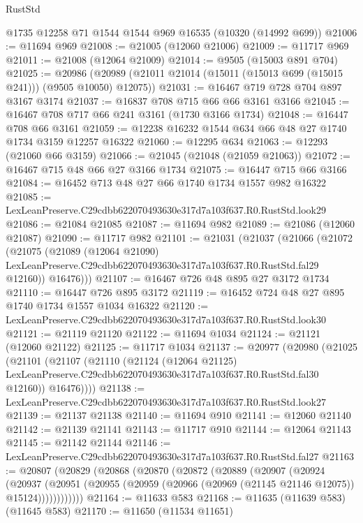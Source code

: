 \begin{lexlean}{RustStd}
\begin{coremodule}
    @1735
    @12258
    @71
    @1544
    @1544
    @969
    @16535
    (@10320 (@14992 @699))
@21006 := @11694 @969
@21008 := @21005 (@12060 @21006)
@21009 := @11717 @969
@21011 := @21008 (@12064 @21009)
@21014 := @9505 (@15003 @891 @704)
@21025 := @20986 (@20989 (@21011 @21014 (@15011 (@15013 @699 (@15015 @241))) (@9505 @10050) @12075))
@21031 := @16467 @719 @728 @704 @897 @3167 @3174
@21037 := @16837 @708 @715 @66 @66 @3161 @3166
@21045 := @16467 @708 @717 @66 @241 @3161 (@1730 @3166 @1734)
@21048 := @16447 @708 @66 @3161
@21059 := @12238 @16232 @1544 @634 @66 @48 @27 @1740 @1734 @3159 @12257 @16322
@21060 := @12295 @634
@21063 := @12293 (@21060 @66 @3159)
@21066 := @21045 (@21048 (@21059 @21063))
@21072 := @16467 @715 @48 @66 @27 @3166 @1734
@21075 := @16447 @715 @66 @3166
@21084 := @16452 @713 @48 @27 @66 @1740 @1734 @1557 @982 @16322
@21085 := LexLeanPreserve.C29cdbb622070493630e317d7a103f637.R0.RustStd.look29
@21086 := @21084 @21085
@21087 := @11694 @982
@21089 := @21086 (@12060 @21087)
@21090 := @11717 @982
@21101 := @21031
    (@21037
      (@21066
        (@21072
          (@21075
            (@21089
              (@12064 @21090)
              LexLeanPreserve.C29cdbb622070493630e317d7a103f637.R0.RustStd.fal29
              @12160))
          @16476)))
@21107 := @16467 @726 @48 @895 @27 @3172 @1734
@21110 := @16447 @726 @895 @3172
@21119 := @16452 @724 @48 @27 @895 @1740 @1734 @1557 @1034 @16322
@21120 := LexLeanPreserve.C29cdbb622070493630e317d7a103f637.R0.RustStd.look30
@21121 := @21119 @21120
@21122 := @11694 @1034
@21124 := @21121 (@12060 @21122)
@21125 := @11717 @1034
@21137 := @20977
    (@20980
      (@21025
        (@21101
          (@21107
            (@21110
              (@21124
                (@12064 @21125)
                LexLeanPreserve.C29cdbb622070493630e317d7a103f637.R0.RustStd.fal30
                @12160))
            @16476))))
@21138 := LexLeanPreserve.C29cdbb622070493630e317d7a103f637.R0.RustStd.look27
@21139 := @21137 @21138
@21140 := @11694 @910
@21141 := @12060 @21140
@21142 := @21139 @21141
@21143 := @11717 @910
@21144 := @12064 @21143
@21145 := @21142 @21144
@21146 := LexLeanPreserve.C29cdbb622070493630e317d7a103f637.R0.RustStd.fal27
@21163 := @20807
    (@20829
      (@20868
        (@20870
          (@20872
            (@20889
              (@20907
                (@20924
                  (@20937
                    (@20951
                      (@20955 (@20959 (@20966 (@20969 (@21145 @21146 @12075)) @15124))))))))))))
@21164 := @11633 @583
@21168 := @11635 (@11639 @583) (@11645 @583)
@21170 := @11650 (@11534 @11651)

\end{coremodule}
\end{lexlean}
